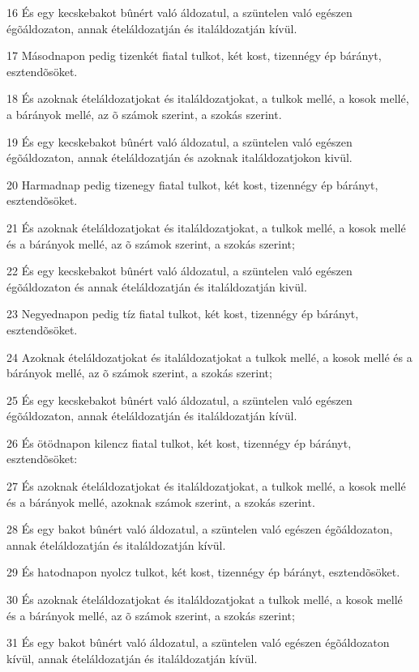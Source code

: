 \par 16 És egy kecskebakot bûnért való áldozatul, a szüntelen való egészen égõáldozaton, annak ételáldozatján és italáldozatján kívül.
\par 17 Másodnapon pedig tizenkét fiatal tulkot, két kost, tizennégy ép bárányt, esztendõsöket.
\par 18 És azoknak ételáldozatjokat és italáldozatjokat, a tulkok mellé, a kosok mellé, a bárányok mellé, az õ számok szerint, a szokás szerint.
\par 19 És egy kecskebakot bûnért való áldozatul, a szüntelen való egészen égõáldozaton, annak ételáldozatján és azoknak italáldozatjokon kivül.
\par 20 Harmadnap pedig tizenegy fiatal tulkot, két kost, tizennégy ép bárányt, esztendõsöket.
\par 21 És azoknak ételáldozatjokat és italáldozatjokat, a tulkok mellé, a kosok mellé és a bárányok mellé, az õ számok szerint, a szokás szerint;
\par 22 És egy kecskebakot bûnért való áldozatul, a szüntelen való egészen égõáldozaton és annak ételáldozatján és italáldozatján kivül.
\par 23 Negyednapon pedig tíz fiatal tulkot, két kost, tizennégy ép bárányt, esztendõsöket.
\par 24 Azoknak ételáldozatjokat és italáldozatjokat a tulkok mellé, a kosok mellé és a bárányok mellé, az õ számok szerint, a szokás szerint;
\par 25 És egy kecskebakot bûnért való áldozatul, a szüntelen való egészen égõáldozaton, annak ételáldozatján és italáldozatján kívül.
\par 26 És ötödnapon kilencz fiatal tulkot, két kost, tizennégy ép bárányt, esztendõsöket:
\par 27 És azoknak ételáldozatjokat és italáldozatjokat, a tulkok mellé, a kosok mellé és a bárányok mellé, azoknak számok szerint, a szokás szerint.
\par 28 És egy bakot bûnért való áldozatul, a szüntelen való egészen égõáldozaton, annak ételáldozatján és italáldozatján kívül.
\par 29 És hatodnapon nyolcz tulkot, két kost, tizennégy ép bárányt, esztendõsöket.
\par 30 És azoknak ételáldozatjokat és italáldozatjokat a tulkok mellé, a kosok mellé és a bárányok mellé, az õ számok szerint, a szokás szerint;
\par 31 És egy bakot bûnért való áldozatul, a szüntelen való egészen égõáldozaton kívül, annak ételáldozatján és italáldozatján kívül.
